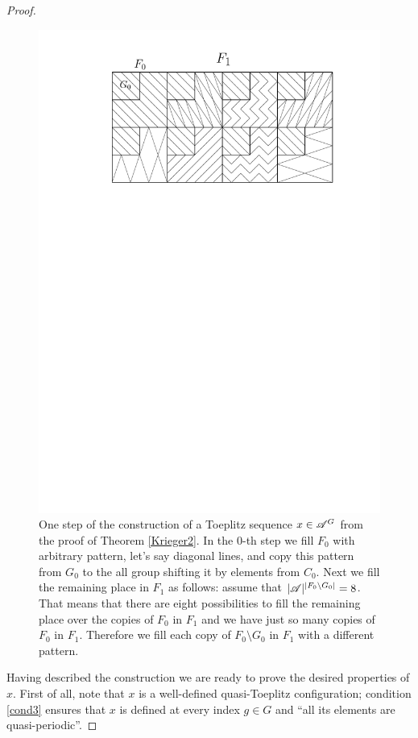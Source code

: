 \begin{proof}
\begin{figure}
\centering
\includegraphics[scale=1]{../Graphics/krieger_construct}
\caption{One step of the construction of a Toeplitz sequence $x\in\mathscr{A}^G$  from the proof of Theorem \ref{Krieger2}. In the $0$-th step we fill $F_0$ with arbitrary pattern, let's say diagonal lines, and copy this pattern from $G_0$ to the all group shifting it by elements from $C_0$. Next we fill the remaining place in $F_1$ as follows: assume that $|\mathscr{A}|^{|F_0\setminus G_0|}=8$. That means that there are eight possibilities to fill the remaining place over the copies of $F_0$ in $F_1$ and we have just so many copies of $F_0$ in $F_1$. Therefore we fill each copy of $F_0\setminus G_0$ in $F_1$ with a different pattern.}\label{fig:krieger_construction}
\end{figure}

Having described the construction we are ready to prove the desired properties of $x$.
%
First of all, note that $x$ is a well-defined quasi-Toeplitz configuration; condition \ref{cond3} ensures that $x$ is defined at every index $g\in G$ and ``all its elements are quasi-periodic''.


\end{proof}
